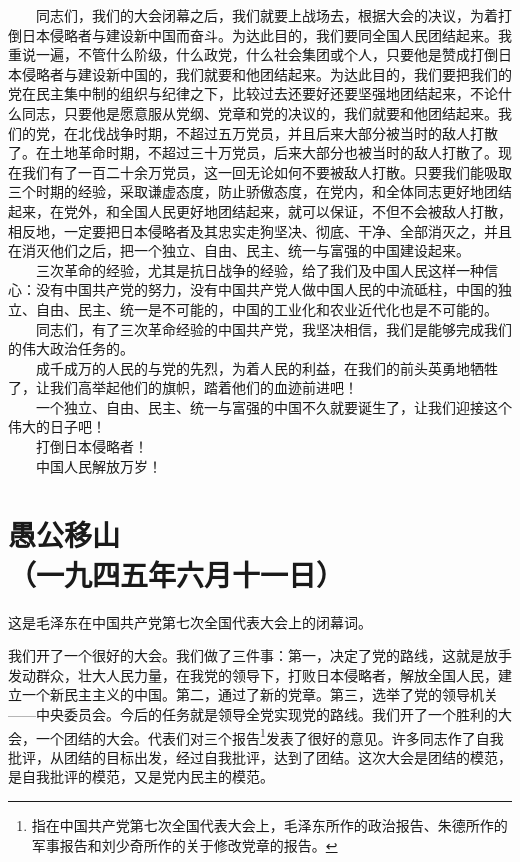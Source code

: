 \documentclass[cn,11pt,chinese]{elegantbook}
\def\myformat#1{\hfil\hfil #1}
\begin{document}
　　同志们，我们的大会闭幕之后，我们就要上战场去，根据大会的决议，为着打倒日本侵略者与建设新中国而奋斗。为达此目的，我们要同全国人民团结起来。我重说一遍，不管什么阶级，什么政党，什么社会集团或个人，只要他是赞成打倒日本侵略者与建设新中国的，我们就要和他团结起来。为达此目的，我们要把我们的党在民主集中制的组织与纪律之下，比较过去还要好还要坚强地团结起来，不论什么同志，只要他是愿意服从党纲、党章和党的决议的，我们就要和他团结起来。我们的党，在北伐战争时期，不超过五万党员，并且后来大部分被当时的敌人打散了。在土地革命时期，不超过三十万党员，后来大部分也被当时的敌人打散了。现在我们有了一百二十余万党员，这一回无论如何不要被敌人打散。只要我们能吸取三个时期的经验，采取谦虚态度，防止骄傲态度，在党内，和全体同志更好地团结起来，在党外，和全国人民更好地团结起来，就可以保证，不但不会被敌人打散，相反地，一定要把日本侵略者及其忠实走狗坚决、彻底、干净、全部消灭之，并且在消灭他们之后，把一个独立、自由、民主、统一与富强的中国建设起来。\\
　　三次革命的经验，尤其是抗日战争的经验，给了我们及中国人民这样一种信心：没有中国共产党的努力，没有中国共产党人做中国人民的中流砥柱，中国的独立、自由、民主、统一是不可能的，中国的工业化和农业近代化也是不可能的。\\
　　同志们，有了三次革命经验的中国共产党，我坚决相信，我们是能够完成我们的伟大政治任务的。\\
　　成千成万的人民的与党的先烈，为着人民的利益，在我们的前头英勇地牺牲了，让我们高举起他们的旗帜，踏着他们的血迹前进吧！\\
　　一个独立、自由、民主、统一与富强的中国不久就要诞生了，让我们迎接这个伟大的日子吧！\\
　　打倒日本侵略者！\\
　　中国人民解放万岁！
\newpage\section*{\myformat{愚公移山}\\\myformat{（一九四五年六月十一日）}}
\begin{introduction}\item  这是毛泽东在中国共产党第七次全国代表大会上的闭幕词。\end{introduction}
我们开了一个很好的大会。我们做了三件事：第一，决定了党的路线，这就是放手发动群众，壮大人民力量，在我党的领导下，打败日本侵略者，解放全国人民，建立一个新民主主义的中国。第二，通过了新的党章。第三，选举了党的领导机关——中央委员会。今后的任务就是领导全党实现党的路线。我们开了一个胜利的大会，一个团结的大会。代表们对三个报告\footnote[1]{ 指在中国共产党第七次全国代表大会上，毛泽东所作的政治报告、朱德所作的军事报告和刘少奇所作的关于修改党章的报告。}发表了很好的意见。许多同志作了自我批评，从团结的目标出发，经过自我批评，达到了团结。这次大会是团结的模范，是自我批评的模范，又是党内民主的模范。\\
\end{document}
